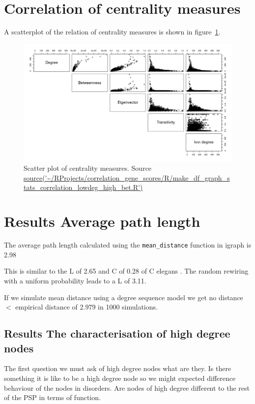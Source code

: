 \section{Correlation of centrality measures}

A scatterplot of the relation of centrality measures is shown in figure~\ref{fig:scatter plot of multiple centrality measures}.

\begin{figure}
    \centering
    \includegraphics[width=\textwidth]{images/Rplot_pairs_plot.png}
    \caption{Scatter plot of centrality measures. Source \url{source('~/RProjects/correlation_gene_scores/R/make_df_graph_stats_correlation_lowdeg_high_bet.R')}}
    \label{fig:scatter plot of multiple centrality measures}
\end{figure}

\section{ Results Average path length}
\label{sec:Results average path length and transitivity}
The average path length calculated using the \texttt{mean\_distance} function in igraph is 2.98


This is similar to the L of 2.65 and C of 0.28 of C elegans . The random rewiring with a uniform probability leads to a L of 3.11. 

If we simulate mean distance using a degree sequence model we get no distance $<$ empirical distance of 2.979 in 1000 simulations.
\subsection{Results The characterisation of high degree nodes}
The first question we must ask of high degree nodes what are they. Is there something it is like to be a high degree node so we might expected difference behaviour of the nodes in disorders.
Are nodes of high degree different to the rest of the PSP in terms of function. 

